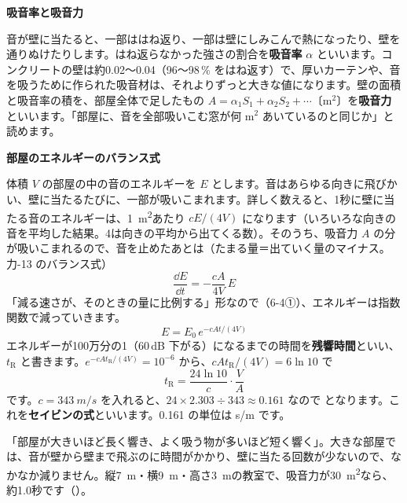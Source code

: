 \noindent\textbf{吸音率と吸音力}\par\nobreak
音が壁に当たると、一部ははね返り、一部は壁にしみこんで熱になったり、壁を通りぬけたりします。はね返らなかった強さの割合を\textbf{吸音率} $\alpha$ といいます。コンクリートの壁は約0.02〜0.04（96〜98\,\% をはね返す）で、厚いカーテンや、音を吸うために作られた吸音材は、それよりずっと大きな値になります。壁の面積と吸音率の積を、部屋全体で足したもの $A=\alpha_1S_1+\alpha_2S_2+\cdots$〔m$^2$〕を\textbf{吸音力}といいます。「部屋に、音を全部吸いこむ窓が何 m$^2$ あいているのと同じか」と読めます。

\noindent\textbf{部屋のエネルギーのバランス式}\par\nobreak
体積 $V$ の部屋の中の音のエネルギーを $E$ とします。音はあらゆる向きに飛びかい、壁に当たるたびに、一部が吸いこまれます。詳しく数えると、1秒に壁に当たる音のエネルギーは、\qty{1}{m^2}あたり $cE/(4V)$ になります（いろいろな向きの音を平均した結果。4は向きの平均から出てくる数）。そのうち、吸音力 $A$ の分が吸いこまれるので、音を止めたあとは（たまる量＝出ていく量のマイナス。力-13 のバランス式）
\[ \frac{\dd E}{\dd t}=-\frac{cA}{4V}\,E \]
「減る速さが、そのときの量に比例する」形なので（6-4①）、エネルギーは指数関数で減っていきます。
\[ E=E_0\,e^{-cAt/(4V)} \]
エネルギーが100万分の1（60\,dB 下がる）になるまでの時間を\textbf{残響時間}といい、$t_{\mathrm R}$ と書きます。$e^{-cAt_{\mathrm R}/(4V)}=10^{-6}$ から、$cAt_{\mathrm R}/(4V)=6\ln10$ で
\[ t_{\mathrm R}=\frac{24\ln10}{c}\cdot\frac{V}{A} \]
です。$c=\qty{343}{m/s}$ を入れると、$24\times2.303\div343\approx0.161$ なので
\label{ph:波-9:sabine}となります。これを\textbf{セイビンの式}といいます。0.161 の単位は s/m です。

\begin{phyomi}[$t_{\mathrm R}=0.161\,V/A$]
「部屋が大きいほど長く響き、よく吸う物が多いほど短く響く」。大きな部屋では、音が壁から壁まで飛ぶのに時間がかかり、壁に当たる回数が少ないので、なかなか減りません。縦\qty{7}{m}・横\qty{9}{m}・高さ\qty{3}{m}の教室で、吸音力が\qty{30}{m^2}なら、約1.0秒です（）。
\end{phyomi}


